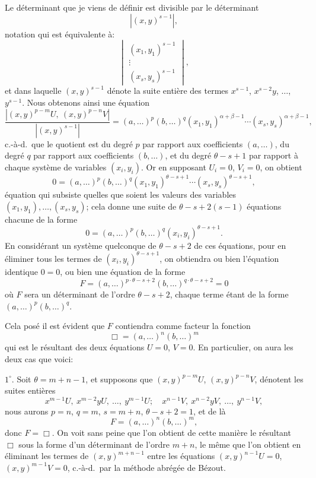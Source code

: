 \documentclass[11pt,a4paper]{article}
\begin{document}
\noindent Le d\'{e}terminant que je viens de d\'{e}finir est divisible par le d\'{e}terminant
\[
|(x,y)^{s-1}|,
\]
notation qui est \'{e}quivalente \`{a}:
\[
\begin{vmatrix}
(x_1, y_1)^{s-1} \\
\vdots \\
(x_s, y_s)^{s-1}
\end{vmatrix},
\]
et dans laquelle $(x,y)^{s-1}$ d\'{e}note la suite enti\`{e}re des termes $x^{s-1}$, $x^{s-2}y$, $\ldots$, $y^{s-1}$. Nous obtenons ainsi une \'{e}quation
\[
\frac{|(x,y)^{p-m}U,\ (x,y)^{p-n}V|}{|(x,y)^{s-1}|}
= (a,\ldots)^p(b,\ldots)^q(x_1, y_1)^{\alpha+\beta-1}\cdots (x_s, y_s)^{\alpha+\beta-1},
\]
c.-\`{a}-d.\ que le quotient est du degr\'{e} $p$ par rapport aux coefficients $(a,\ldots)$, du degr\'{e} $q$ par rapport aux coefficients $(b,\ldots)$, et du degr\'{e} $\theta-s+1$ par rapport \`{a} chaque syst\`{e}me de variables $(x_i,y_i)$. Or en supposant $U_i=0$, $V_i=0$, on obtient
\[
0=(a,\ldots)^p(b,\ldots)^q(x_1, y_1)^{\theta-s+1}\cdots(x_s, y_s)^{\theta-s+1},
\]
\'{e}quation qui subsiste quelles que soient les valeurs des variables $(x_1,y_1),\ldots,(x_s,y_s)$; cela donne une suite de $\theta-s+2(s-1)$ \'{e}quations chacune de la forme
\[
0=(a,\ldots)^p(b,\ldots)^q(x_i, y_i)^{\theta-s+1}.
\]
En consid\'{e}rant un syst\`{e}me quelconque de $\theta-s+2$ de ces \'{e}quations, pour en \'{e}liminer tous les termes de $(x_i, y_i)^{\theta-s+1}$, on obtiendra ou bien l'\'{e}quation identique $0=0$, ou bien une \'{e}quation de la forme
\[
F=(a,\ldots)^{p\cdot \theta-s+2}(b,\ldots)^{q\cdot \theta-s+2}=0
\]
o\`{u} $F$ sera un d\'{e}terminant de l'ordre $\theta-s+2$, chaque terme \'{e}tant de la forme $(a,\ldots)^p(b,\ldots)^q$.

\medskip

\noindent Cela pos\'{e} il est \'{e}vident que $F$ contiendra comme facteur la fonction
\[
\Box=(a,\ldots)^n(b,\ldots)^m
\]
qui est le r\'{e}sultant des deux \'{e}quations $U=0$, $V=0$. En particulier, on aura les deux cas que voici:

\medskip

\noindent $1^{\circ}$. Soit $\theta=m+n-1$, et supposons que $(x,y)^{p-m}U$, $(x,y)^{p-n}V$, d\'{e}notent les suites enti\`{e}res
\[
x^{m-1}U,\ x^{m-2}yU,\ \ldots,\ y^{m-1}U;\quad x^{n-1}V,\ x^{n-2}yV,\ \ldots,\ y^{n-1}V,
\]
nous aurons $p=n$, $q=m$, $s=m+n$, $\theta-s+2=1$, et de l\`{a}
\[
F=(a,\ldots)^n(b,\ldots)^m,
\]
donc $F=\Box$. On voit sans peine que l'on obtient de cette mani\`{e}re le r\'{e}sultant $\Box$ sous la forme d'un d\'{e}terminant de l'ordre $m+n$, le m\^{e}me que l'on obtient en \'{e}liminant les termes de $(x,y)^{m+n-1}$ entre les \'{e}quations $(x,y)^{n-1}U=0$, $(x,y)^{m-1}V=0$, c.-\`{a}-d.\ par la m\'{e}thode abr\'{e}g\'{e}e de B\'{e}zout.
\end{document}
